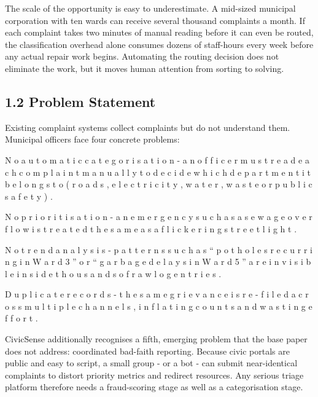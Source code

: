 \documentclass[10pt,letterpaper,oneside]{article}\usepackage{geometry}\geometry{top=1in,bottom=1in,left=1in,right=1in,includeheadfoot}\usepackage{xcolor}\definecolor{color@navy}{HTML}{1F3B63}\definecolor{color@grey}{HTML}{404040}\definecolor{color@hdr}{HTML}{F2F4F7}\usepackage{titlesec}\titleformat{\section}  {\normalfont\huge\bfseries\color@navy}  {}{0pt}{\MakeUppercase}\titleformat{\subsection}  {\normalfont\Large\bfseries\color@navy}  {}{0pt}{}\titleformat{\subsubsection}  {\normalfont\large\bfseries\color@navy}  {}{0pt}{}\titlespacing*{\section}{0pt}{14pt}{6pt}\titlespacing*{\subsection}{0pt}{10pt}{4pt}\titlespacing*{\subsubsection}{0pt}{8pt}{3pt}\setlength{\parindent}{0pt}\setlength{\parskip}{0.6em}\parindent=0pt\usepackage{enumitem}\setlist{nosep,leftmargin=*,itemsep=0pt,topsep=2pt,partopsep=0pt}\usepackage{array}\usepackage{booktabs}\usepackage{caption}\captionsetup{font={small,it},labelfont={bf},labelsep=period,  parskip=2pt,skip=4pt,list=no}\captionsetup[table]{labelfont={bf,small,color@navy},name=Table}\usepackage{graphicx}\usepackage{verbatim}\usepackage{ragged2e}\usepackage{longtable}\usepackage{tabularx}\usepackage{multirow}\usepackage{colortbl}\definecolor{rowshade}{HTML}{F2F4F7}\usepackage{tikz}\usetikzlibrary{positioning,calc}\usepackage[hidelinks]{hyperref}\hypersetup{colorlinks=true,linkcolor=color@navy,urlcolor=color@navy}\pagestyle{fancy}\fancyhf{}\renewcommand{\headrulewidth}{0.4pt}\fancyhead[L]{\small\color@navy CivicSense — Project Report}\fancyhead[R]{\small\color@grey October 11, 2026}\fancyfoot[C]{\small\color@grey An Integrated Intelligent Triage Pipelin}\fancyfoot[R]{\small\color@grey Page \thepage}\usepackage{setspace}\setstretch{1.15}\AtBeginDocument{  \hypersetup{pdftitle={An Integrated Intelligent Triage Pipeline for AI-Enhanced Citizen Complaint Management},    pdfauthor={CivicSense Project Team},    pdfsubject={Project Report},    pdfkeywords={smart cities, NLP, complaint management, e-governance},    pdfcreator={CivicSense Project Team}  }}
\begin{document}
The scale of the opportunity is easy to underestimate. A mid-sized municipal corporation with ten wards can receive several thousand complaints a month. If each complaint takes two minutes of manual reading before it can even be routed, the classification overhead alone consumes dozens of staff-hours every week before any actual repair work begins. Automating the routing decision does not eliminate the work, but it moves human attention from sorting to solving.

\subsection*{1.2 Problem Statement}
Existing complaint systems collect complaints but do not understand them. Municipal officers face four concrete problems:

\item N o   a u t o m a t i c   c a t e g o r i s a t i o n   -   a n   o f f i c e r   m u s t   r e a d   e a c h   c o m p l a i n t   m a n u a l l y   t o   d e c i d e   w h i c h   d e p a r t m e n t   i t   b e l o n g s   t o   ( r o a d s ,   e l e c t r i c i t y ,   w a t e r ,   w a s t e   o r   p u b l i c   s a f e t y ) .

\item N o   p r i o r i t i s a t i o n   -   a n   e m e r g e n c y   s u c h   a s   a   s e w a g e   o v e r f l o w   i s   t r e a t e d   t h e   s a m e   a s   a   f l i c k e r i n g   s t r e e t l i g h t .

\item N o   t r e n d   a n a l y s i s   -   p a t t e r n s   s u c h   a s   “ p o t h o l e s   r e c u r r i n g   i n   W a r d   3 ”   o r   “ g a r b a g e   d e l a y s   i n   W a r d   5 ”   a r e   i n v i s i b l e   i n s i d e   t h o u s a n d s   o f   r a w   l o g   e n t r i e s .

\item D u p l i c a t e   r e c o r d s   -   t h e   s a m e   g r i e v a n c e   i s   r e - f i l e d   a c r o s s   m u l t i p l e   c h a n n e l s ,   i n f l a t i n g   c o u n t s   a n d   w a s t i n g   e f f o r t .

CivicSense additionally recognises a fifth, emerging problem that the base paper does not address: coordinated bad-faith reporting. Because civic portals are public and easy to script, a small group - or a bot - can submit near-identical complaints to distort priority metrics and redirect resources. Any serious triage platform therefore needs a fraud-scoring stage as well as a categorisation stage.
\end{document}
